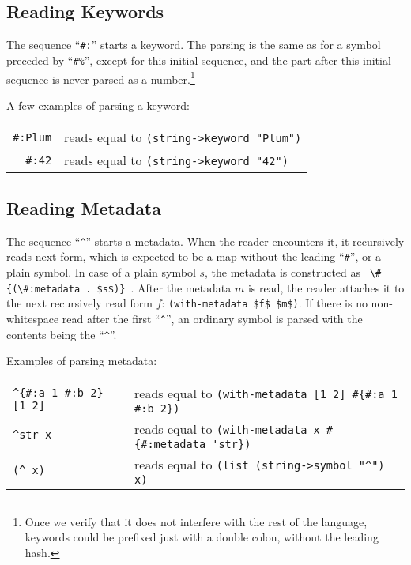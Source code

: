 \subsection{Reading Keywords}
\label{subsec:aml-base-lang-reader-keywords}

The sequence ``\lstinline!#:!'' starts a keyword. The parsing is the same as for a symbol preceded by ``\lstinline!#%!'', except for this initial sequence, and the part after this initial sequence is never parsed as a number.\footnote{Once we verify that it does not interfere with the rest of the language, keywords could be prefixed just with a double colon, without the leading hash.}

\example A few examples of parsing a keyword:

\begin{tabular}{ r l }
  \lstinline!#:Plum! & reads equal to \lstinline!(string->keyword "Plum")! \\
  \lstinline!#:42! & reads equal to \lstinline!(string->keyword "42")! \\
\end{tabular}





\subsection{Reading Metadata}
\label{subsec:aml-base-lang-reader-metadata}


The sequence ``\lstinline!^!'' starts a metadata. When the reader encounters it, it recursively reads next form, which is expected to be a map without the leading ``\lstinline!#!'', or a plain symbol. In case of a plain symbol $s$, the metadata is constructed as \lstinline! \#{(\#:metadata . $s$)} !. After the metadata $m$ is read, the reader attaches it to the next recursively read form $f$\thinspace: \lstinline!(with-metadata $f$ $m$)!. If there is no non-whitespace read after the first ``\lstinline!^!'', an ordinary symbol is parsed with the contents being the ``\lstinline!^!''.

\example Examples of parsing metadata:

\begin{tabular}{ l l }
  \lstinline!^{#:a 1 #:b 2} [1 2]! & reads equal to \lstinline!(with-metadata [1 2] #{#:a 1 #:b 2})! \\
  \lstinline!^str x! & reads equal to \lstinline!(with-metadata x #{#:metadata 'str})! \\
  \lstinline!(^ x)! & reads equal to \lstinline!(list (string->symbol "^") x)! \\
\end{tabular}







